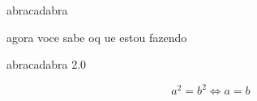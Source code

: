 \documentclass{book}
\begin{document}
abracadabra

agora voce sabe oq ue estou fazendo

 abracadabra 2.0

\begin{equation}
    a^2=b^2 \Leftrightarrow a=b
\end{equation}    
\end{document}
